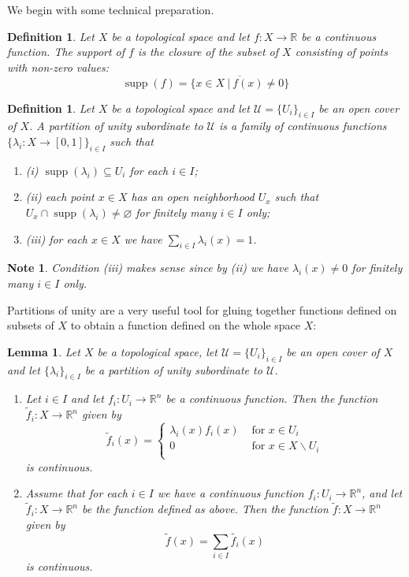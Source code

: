 \documentclass[11pt, letterpaper, oneside]{report}
\theoremstyle{pplain}
\newtheorem{lemma}[theorem]{Lemma}
\newtheorem{ITERMVALUE THM}[theorem]{Intermediate Value Theorem}
\newtheorem{HEINEBOREL THM}[theorem]{Heine-Borel Theorem}
\newtheorem{UMETR THM}[theorem]{Urysohn Metrization Theorem}
\newtheorem{UMETR2 THM}[theorem]{Urysohn Metrization Theorem (v.2)}
\theoremstyle{ddefinition}
\newtheorem{definition}[theorem]{Definition}
\newtheorem{note}[theorem]{Note}
\theoremstyle{nnn}
\newtheorem{TDA NN}[theorem]{Topological Data Analysis. }
\theoremstyle{eexercise}
\newcommand{\R}{{\mathbb R}}
\newcommand{\ssmin}{\smallsetminus}
\newcommand{\benu}{\begin{enumerate}}
\newcommand{\eenu}{\end{enumerate}}
\DeclareMathOperator\supp{supp}
\begin{document}
We begin with some technical preparation.

\begin{definition}
\label{SUPPORT DEF}
Let $X$ be a topological space and let $f\colon X \to \R$ be a continuous function. 
The \emph{support} of $f$ is the closure of the subset of $X$ consisting of points with 
non-zero values:
$$\supp(f) = \overline{\{x\in X \ | \ f(x)\neq 0 \}}$$ 
\end{definition}

\begin{definition}
\label{PARTITION OF UNITY DEF}
Let $X$ be a topological space and let $\mathcal{U} = \{U_{i}\}_{i\in I}$ be an open cover of $X$. 
A \emph{partition of unity subordinate to $\mathcal{U}$} is a family of continuous functions 
$\{\lambda_{i}\colon X\to [0,1]\}_{i\in I}$ such that 
\benu
\item[(i)] $\supp(\lambda_{i}) \subseteq U_{i}$ for each $i\in I$;
\item[(ii)]  each point $x\in X$ has an open neighborhood $U_{x}$ such that 
$U_{x}\cap \supp(\lambda_{i}) \neq \varnothing$ for finitely many $i\in I$ only;
\item[(iii)] for each $x\in X$ we have $\sum_{i\in I} \lambda_{i}(x) = 1$. 
\eenu
\end{definition}
 
 
\begin{note}
Condition (iii) makes sense since by (ii) we have $\lambda_{i}(x) \neq 0$  for  finitely many $i\in I$ only. 
\end{note}

Partitions of unity are a very useful tool for gluing together functions defined on subsets of $X$
to obtain a function defined on the whole space $X$:

\begin{lemma}
\label{PARTITION OF UNITY GLUEING LEMMMA}
Let $X$ be a topological space, let $\mathcal{U} = \{U_{i}\}_{i\in I}$ be an open cover of $X$
and let $\{\lambda_{i}\}_{i\in I}$ be a partition of unity subordinate to $\mathcal{U}$. 
\benu
\item Let $i\in I$ and let $f_{i}\colon U_{i}\to \R^{n}$ be a continuous function. Then the function 
$\tilde{f}_{i}\colon X\to \R^{n}$ given by 
$$
\tilde{f}_{i}(x) = 
\begin{cases}
\lambda_{i}(x)f_{i}(x) & \text{ for } x\in U_{i} \\
0 & \text{ for } x\in X\ssmin U_{i} \\
\end{cases}
$$
is continuous. 
 
\item Assume that for each $i\in I$ we have a continuous function $f_{i}\colon U_{i}\to \R^{n}$,
and let $\tilde{f}_{i}\colon X\to \R^{n}$ be  the function defined as above. Then the function 
$\tilde{f}\colon X \to \R^{n}$ given by 
$$\tilde{f}(x) = \sum_{i\in I} \tilde{f_{i}}(x)$$
is continuous. 
\eenu
\end{lemma}
\end{document}
